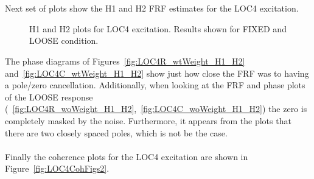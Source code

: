 \documentclass[paper=a4, fontsize=12pt]{scrartcl} %
\begin{document}
\\
\\
Next set of plots show the H1 and H2 FRF estimates for the LOC4 excitation.
%
	\begin{figure}[H]
		\centering
		\quad
		\quad
		\quad
		\caption{H1 and H2 plots for LOC4 excitation. Results shown for FIXED and LOOSE condition.}
		\label{fig:LOC4H1H2Figs}
	\end{figure}
%
The phase diagrams of Figures~\ref{fig:LOC4R_wtWeight_H1_H2} and~\ref{fig:LOC4C_wtWeight_H1_H2} show just how close the FRF was to having a pole/zero cancellation. Additionally, when looking at the FRF and phase plots of the LOOSE response (~\ref{fig:LOC4R_woWeight_H1_H2},~\ref{fig:LOC4C_woWeight_H1_H2}) the zero is completely masked by the noise. Furthermore, it appears from the plots that there are two closely spaced poles, which is not be the case.
%
\\
\\
Finally the coherence plots for the LOC4 excitation are shown in Figure~\ref{fig:LOC4CohFigs2}.
%
\end{document}
